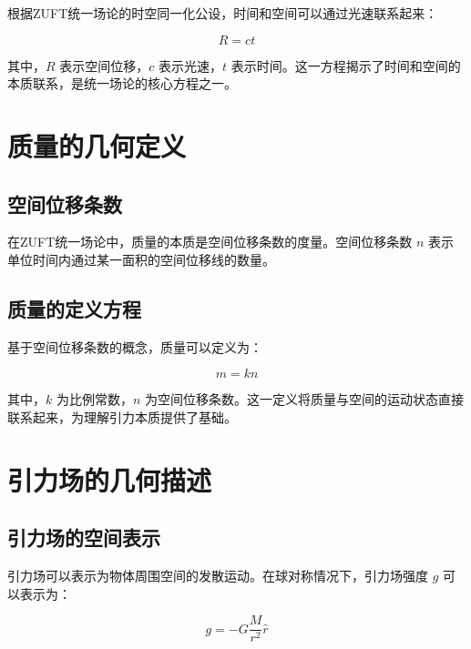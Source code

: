 \documentclass[12pt,a4paper]{article}
\begin{document}
根据ZUFT统一场论的时空同一化公设，时间和空间可以通过光速联系起来：

\begin{equation}
R = c t

\end{equation}

其中，$R$ 表示空间位移，$c$ 表示光速，$t$ 表示时间。这一方程揭示了时间和空间的本质联系，是统一场论的核心方程之一。

\section{质量的几何定义}
\label{section:mass_geometric_definition}

\subsection{空间位移条数}
\label{subsection:space_displacement_lines}

在ZUFT统一场论中，质量的本质是空间位移条数的度量。空间位移条数 $n$ 表示单位时间内通过某一面积的空间位移线的数量。

\subsection{质量的定义方程}
\label{subsection:mass_definition_equation}

基于空间位移条数的概念，质量可以定义为：

\begin{equation}
m = k n

\end{equation}

其中，$k$ 为比例常数，$n$ 为空间位移条数。这一定义将质量与空间的运动状态直接联系起来，为理解引力本质提供了基础。

\section{引力场的几何描述}
\label{section:gravitational_field_geometric}

\subsection{引力场的空间表示}
\label{subsection:gravitational_field_representation}

引力场可以表示为物体周围空间的发散运动。在球对称情况下，引力场强度 $g$ 可以表示为：

\begin{equation}
g = -G \frac{M}{r^2} \hat{r}

\end{equation}
\end{document}
